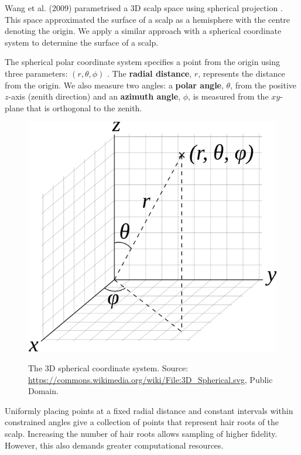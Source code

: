 \documentclass[ %
author={Dillon Keith Diep},
supervisor={Dr. Carl Henrik Ek},
degree={MEng},
title={ART-CG Hair:},
subtitle={Assisted Real-time Content Generation of Stylised Virtual Hair},
type={Research},
year={2017} ]{dissertation}
\begin{document}
Wang et al. (2009) parametrised a 3D scalp space using spherical projection \cite{examplebasedhair}. This space approximated the surface of a scalp as a hemisphere with the centre denoting the origin. We apply a similar approach with a spherical coordinate system to determine the surface of a scalp.

The spherical polar coordinate system specifies a point from the origin using three parameters:  $(r,\theta,\phi)$ \cite[pp.123-126]{sphericalcoords}. The \textbf{radial distance}, $r$, represents the distance from the origin. We also measure two angles: a \textbf{polar angle}, $\theta$, from the positive $z$-axis (zenith direction) and an \textbf{azimuth angle}, $\phi$, is measured from the $xy$-plane that is orthogonal to the zenith.

\begin{figure}[!h]
	\centering
	\includegraphics[scale=0.25]{images/sphereCoords}\\
	\caption{The 3D spherical coordinate system.
	Source: \href{https://commons.wikimedia.org/wiki/File:3D_Spherical.svg}{https://commons.wikimedia.org/wiki/File:3D\_Spherical.svg}, Public Domain.}
\end{figure}

Uniformly placing points at a fixed radial distance and constant intervals within constrained angles give a collection of points that represent hair roots of the scalp. Increasing the number of hair roots allows sampling of higher fidelity. However, this also demands greater computational resources.
\end{document}
